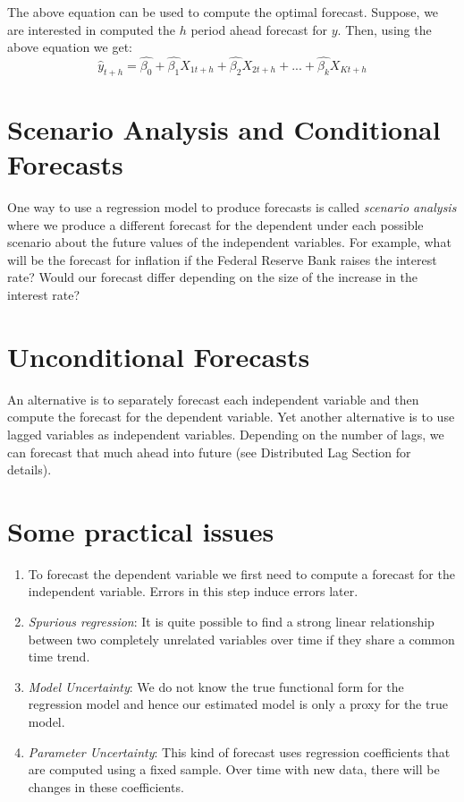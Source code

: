 \documentclass[]{book}
\theoremstyle{definition}
\theoremstyle{definition}
\theoremstyle{definition}
\theoremstyle{remark}
\begin{document}
The above equation can be used to compute the optimal forecast. Suppose,
we are interested in computed the \(h\) period ahead forecast for \(y\).
Then, using the above equation we get: \begin{equation}
        \widehat{y}_{t+h} =  \widehat{\beta_0} +\widehat{\beta_1} X_{1t+h} +\widehat{\beta_2} X_{2t+h}+...+ \widehat{\beta_k} X_{Kt+h}
    \end{equation}

\hypertarget{scenario-analysis-and-conditional-forecasts}{%
\section{Scenario Analysis and Conditional
Forecasts}\label{scenario-analysis-and-conditional-forecasts}}

One way to use a regression model to produce forecasts is called
\emph{scenario analysis} where we produce a different forecast for the
dependent under each possible scenario about the future values of the
independent variables. For example, what will be the forecast for
inflation if the Federal Reserve Bank raises the interest rate? Would
our forecast differ depending on the size of the increase in the
interest rate?

\hypertarget{unconditional-forecasts}{%
\section{Unconditional Forecasts}\label{unconditional-forecasts}}

An alternative is to separately forecast each independent variable and
then compute the forecast for the dependent variable. Yet another
alternative is to use lagged variables as independent variables.
Depending on the number of lags, we can forecast that much ahead into
future (see Distributed Lag Section for details).

\hypertarget{some-practical-issues}{%
\section{Some practical issues}\label{some-practical-issues}}

\begin{enumerate}
\def\labelenumi{\arabic{enumi}.}
\item
  To forecast the dependent variable we first need to compute a forecast
  for the independent variable. Errors in this step induce errors later.
\item
  \emph{Spurious regression}: It is quite possible to find a strong
  linear relationship between two completely unrelated variables over
  time if they share a common time trend.
\item
  \emph{Model Uncertainty}: We do not know the true functional form for
  the regression model and hence our estimated model is only a proxy for
  the true model.
\item
  \emph{Parameter Uncertainty}: This kind of forecast uses regression
  coefficients that are computed using a fixed sample. Over time with
  new data, there will be changes in these coefficients.
\end{enumerate}
\end{document}

